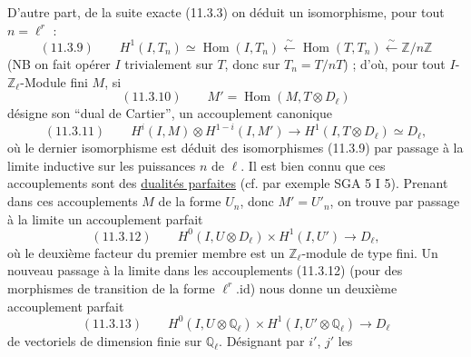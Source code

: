 D'autre part, de la suite exacte (11.3.3) on déduit un isomorphisme, pour tout $n=\ell^r$ :
\[
(11.3.9)\qquad H^1(I,T_n)\simeq\operatorname{Hom}(I,T_n)\xleftarrow{\sim}\operatorname{Hom}(T,T_n)\xleftarrow{\sim}\mathbb Z/n\mathbb Z
\]
(NB on fait opérer $I$ trivialement sur $T$, donc sur $T_n=T/nT$) ; d'où, pour tout $I$-$\mathbb Z_\ell$-Module fini $M$, si
\[
(11.3.10)\qquad M'=\operatorname{Hom}(M,T\otimes D_\ell)
\]
désigne son ``dual de Cartier'', un accouplement canonique
\[
(11.3.11)\qquad H^i(I,M)\otimes H^{1-i}(I,M')\longrightarrow H^1(I,T\otimes D_\ell)\simeq D_\ell,
\]
où le dernier isomorphisme est déduit des isomorphismes (11.3.9) par passage à la limite inductive sur les puissances $n$ de $\ell$. Il est bien connu que ces accouplements sont des \uline{dualités parfaites} (cf. par exemple SGA 5 I 5). Prenant dans ces accouplements $M$ de la forme $U_n$, donc $M'=U'_n$, on trouve par passage à la limite un accouplement parfait
\[
(11.3.12)\qquad H^0(I,U\otimes D_\ell)\times H^1(I,U')\longrightarrow D_\ell,
\]
où le deuxième facteur du premier membre est un $\mathbb Z_\ell$-module de type fini. Un nouveau passage à la limite dans les accouplements (11.3.12) (pour des morphismes de transition de la forme $\ell^r.\mathrm{id}$) nous donne un deuxième accouplement parfait
\[
(11.3.13)\qquad H^0(I,U\otimes\mathbb Q_\ell)\times H^1(I,U'\otimes\mathbb Q_\ell)\longrightarrow D_\ell
\]
de vectoriels de dimension finie sur $\mathbb Q_\ell$. Désignant par $i'$, $j'$ les


